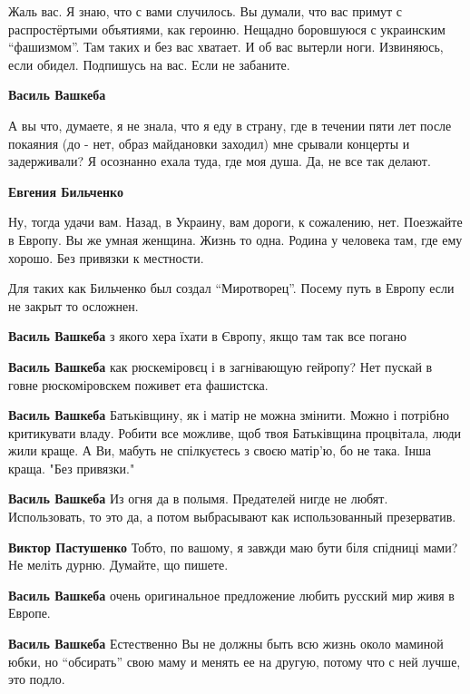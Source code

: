 \begin{itemize}

Жаль вас. Я знаю, что с вами случилось. Вы думали, что вас примут с распростёртыми
объятиями, как героиню. Нещадно боровшуюся с украинским \enquote{фашизмом}. Там таких и
без вас хватает. И об вас вытерли ноги. Извиняюсь, если обидел. Подпишусь на
вас. Если не забаните.

\begin{itemize} %
\textbf{Василь Вашкеба} 

А вы что, думаете, я не знала, что я еду в страну, где в течении пяти лет после
покаяния (до - нет, образ майдановки заходил) мне срывали концерты и
задерживали? Я осознанно ехала туда, где моя душа. Да, не все так делают.

\textbf{Евгения Бильченко} 

Ну, тогда удачи вам. Назад, в Украину, вам дороги, к сожалению, нет. Поезжайте в
Европу. Вы же умная женщина. Жизнь то одна. Родина у человека там, где ему
хорошо. Без привязки к местности.


Для таких как Бильченко был создал \enquote{Миротворец}. Посему путь в Европу если не закрыт то осложнен.

\textbf{Василь Вашкеба} з якого хера їхати в Європу, якщо там так все погано

\textbf{Василь Вашкеба} как рюскеміровєц і в загнівающую гейропу?
Нет пускай в говне рюскоміровскем поживет ета фашистска.

\textbf{Василь Вашкеба} Батьківщину, як і матір не можна змінити. Можно і потрібно критикувати владу. Робити все можливе, щоб твоя Батьківщина процвітала, люди жили краще. А Ви, мабуть не спілкуєтесь з своєю матір'ю, бо не така. Інша краща. "Без привязки."

\textbf{Василь Вашкеба} Из огня да в полымя. Предателей нигде не любят. Использовать, то это да, а потом выбрасывают как использованный презерватив.

\textbf{Виктор Пастушенко} Тобто, по вашому, я завжди маю бути біля спідниці
мами? Не меліть дурню. Думайте, що пишете.

\textbf{Василь Вашкеба} очень оригинальное предложение любить русский мир живя в Европе.

\textbf{Василь Вашкеба} Естественно Вы не должны быть всю жизнь около маминой юбки, но \enquote{обсирать} свою маму и менять ее на другую, потому что с ней лучше, это подло.


\end{itemize}
\end{itemize}
